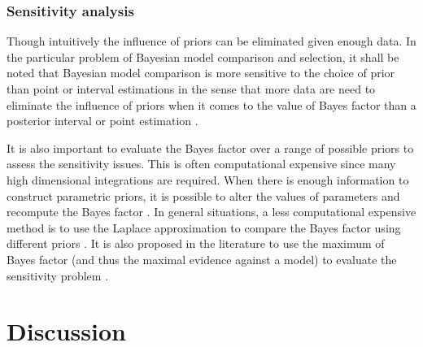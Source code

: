 

\subsubsection{Sensitivity analysis}
\label{ssub:Sensitivity analysis}

Though intuitively the influence of priors can be eliminated given enough
data. In the particular problem of Bayesian model comparison and selection, it
shall be noted that Bayesian model comparison is more sensitive to the choice
of prior than point or interval estimations in the sense that more data are
need to eliminate the influence of priors when it comes to the value of Bayes
factor than a posterior interval or point estimation
\cite{Kass:1993vy,Kass:1995vb}.

It is also important to evaluate the Bayes factor over a range of possible
priors to assess the sensitivity issues. This is often computational expensive
since many high dimensional integrations are required. When there is enough
information to construct parametric priors, it is possible to alter the values
of parameters and recompute the Bayes factor \cite{McCulloch:1991hj}. In
general situations, a less computational expensive method is to use the
Laplace approximation to compare the Bayes factor using different priors
\cite{Kass:1992tz}. It is also proposed in the literature to use the maximum
of Bayes factor (and thus the maximal evidence against a model) to evaluate
the sensitivity problem \cite{Berger:1987iq}.

\section{Discussion}
\label{sec:Model Selection Discussion}
